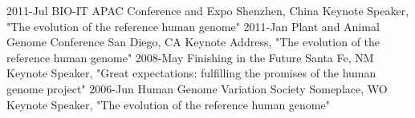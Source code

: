 \documentclass[]{dmc-cv} %
\begin{document}
\begin{entrylist}
\entry
{2011-Jul}
{BIO-IT APAC Conference and Expo}
{Shenzhen, China}
{Keynote Speaker, "The evolution of the reference human genome"}
\entry
{2011-Jan}
{Plant and Animal Genome Conference}
{San Diego, CA}
{Keynote Address, "The evolution of the reference human genome"}
\entry
{2008-May}
{Finishing in the Future}
{Santa Fe, NM}
{Keynote Speaker, "Great expectations: fulfilling the promises of the human genome project"}
\entry
{2006-Jun}
{Human Genome Variation Society}
{Someplace, WO}
{Keynote Speaker, "The evolution of the reference human genome"}
\end{entrylist}


\end{document}

